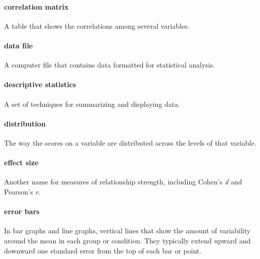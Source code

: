\documentclass[
]{krantz}
\begin{document}
\hypertarget{correlation-matrix-1}{%
\paragraph*{correlation matrix}\label{correlation-matrix-1}}

A table that shows the correlations among several variables.

\hypertarget{data-file}{%
\paragraph*{data file}\label{data-file}}

A computer file that contains data formatted for statistical analysis.

\hypertarget{descriptive-statistics-1}{%
\paragraph*{descriptive statistics}\label{descriptive-statistics-1}}

A set of techniques for summarizing and displaying data.

\hypertarget{distribution}{%
\paragraph*{distribution}\label{distribution}}

The way the scores on a variable are distributed across the levels of that variable.

\hypertarget{effect-size}{%
\paragraph*{effect size}\label{effect-size}}

Another name for measures of relationship strength, including Cohen's \emph{d} and Pearson's \emph{r}.

\hypertarget{error-bars}{%
\paragraph*{error bars}\label{error-bars}}

In bar graphs and line graphs, vertical lines that show the amount of variability around the mean in each group or condition. They typically extend upward and downward one standard error from the top of each bar or point.
\end{document}
